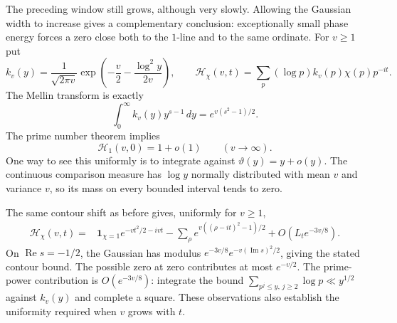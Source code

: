 \documentclass[11pt,letterpaper]{article}
\theoremstyle{definition}
\theoremstyle{remark}
\renewcommand{\Re}{\operatorname{Re}}
\renewcommand{\Im}{\operatorname{Im}}
\newcommand{\1}{\mathbf 1}
\begin{document}
The preceding window still grows, although very slowly.  Allowing
the Gaussian width to increase gives a complementary conclusion:
exceptionally small phase energy forces a zero close both to the
$1$-line and to the same ordinate.  For $v\ge1$ put
\[
 k_v(y)=\frac1{\sqrt{2\pi v}}
   \exp\!\left(-\frac v2-\frac{\log^2 y}{2v}\right),\qquad
 \mathcal H_\chi(v,t)=\sum_p(\log p)k_v(p)\chi(p)p^{-it}.
\]
The Mellin transform is exactly
\begin{equation}
 \int_0^\infty k_v(y)y^{s-1}\,dy
       =e^{v(s^2-1)/2}.
\label{p04:eq:zi-heat-mellin}
\end{equation}
The prime number theorem implies
\begin{equation}
 \mathcal H_1(v,0)=1+o(1)\qquad(v\to\infty).
\label{p04:eq:zi-heat-mass}
\end{equation}
One way to see this uniformly is to integrate against
$\vartheta(y)=y+o(y)$.  The continuous comparison measure has
$\log y$ normally distributed with mean $v$ and variance $v$,
so its mass on every bounded interval tends to zero.

The same contour shift as before gives, uniformly for $v\ge1$,
\begin{align}
 \mathcal H_\chi(v,t)
 ={}&\mathbf1_{\chi=1}e^{-vt^2/2-ivt}
   -\sum_\rho e^{v((\rho-it)^2-1)/2}
   +O\!\left(L_t e^{-3v/8}\right).
\label{p04:eq:zi-heat-explicit}
\end{align}
On $\Re s=-1/2$, the Gaussian has modulus
$e^{-3v/8}e^{-v(\Im s)^2/2}$, giving the stated contour bound.
The possible zero at zero contributes at most $e^{-v/2}$.
The prime-power contribution is $O(e^{-3v/8})$: integrate the
bound $\sum_{p^j\le y,\,j\ge2}\log p\ll y^{1/2}$ against
$k_v(y)$ and complete a square.  These observations also establish
the uniformity required when $v$ grows with $t$.
\end{document}
